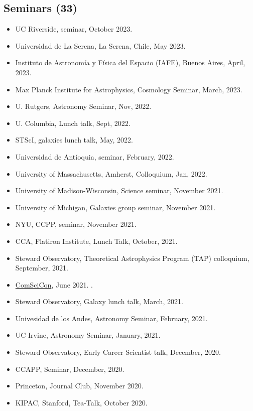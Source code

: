 \documentclass[UTF8]{article}
\begin{document}
\subsection*{Seminars (33)}
\begin{itemize}
  \setlength\itemsep{0.0em}
  \renewcommand\labelitemi{$\cdot$}
\item UC Riverside, seminar, October 2023. \dag
\item Universidad de La Serena, La Serena, Chile, May 2023. \dag 
\item Instituto de Astronom\'ia y F\'isica del Espacio (IAFE), Buenos Aires, April, 2023.
\item Max Planck Institute for Astrophysics, Cosmology Seminar, March, 2023.
\item U. Rutgers, Astronomy Seminar, Nov, 2022. \dag
\item U. Columbia, Lunch talk, Sept, 2022. \dag
\item STScI, galaxies lunch talk, May, 2022. \dag
\item Universidad de Ant\'ioquia, seminar, February, 2022. \dag 
\item University of Massachusetts, Amherst, Colloquium, Jan, 2022. \dag
\item University of Madison-Wisconsin, Science seminar, November 2021.\dag
\item University of Michigan, Galaxies group seminar, November 2021.\dag
\item NYU, CCPP, seminar, November 2021.\dag 
\item CCA, Flatiron Institute, Lunch Talk, October, 2021.
\item Steward Observatory, Theoretical Astrophysics Program (TAP) colloquium, September, 2021.\dag
\item \href{https://comscicon.com/comscicon-en-espa%C3%B1ol-2021}{ComSciCon},
    June 2021. \dag. 
\item Steward Observatory, Galaxy lunch talk, March, 2021.
\item Univesidad de los Andes, Astronomy Seminar, February, 2021. 
\item UC Irvine, Astronomy Seminar, January, 2021. \dag
\item Steward Observatory, Early Career Scientist talk, December, 2020. \dag
\item CCAPP, Seminar, December, 2020. \dag
\item Princeton, Journal Club, November 2020. \dag
\item KIPAC, Stanford, Tea-Talk, October 2020.

\end{itemize}
\end{document}
